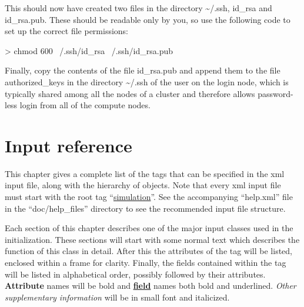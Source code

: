 \documentclass[11pt,english,fleqn]{report}
\newenvironment{code}{%
\footnotesize 
\verbatim
}{
\endverbatim
\normalsize
}
\begin{document}
This should now have created two files in the directory \textasciitilde{}/.ssh,
id\_rsa and id\_rsa.pub. These should be readable only by you, so
use the following code to set up the correct file permissions:

\begin{code}
> chmod 600 ~/.ssh/id_rsa ~/.ssh/id_rsa.pub
\end{code}

\noindent Finally, copy the contents of the file id\_rsa.pub and append them
to the file authorized\_keys in the directory \textasciitilde{}/.ssh
of the user on the login node, which is typically shared among all
the nodes of a cluster and therefore allows password-less login 
from all of the compute nodes.


\chapter{Input reference}

\label{hierarchy}

This chapter gives a complete list of the tags that can be
specified in the xml input file, along with the hierarchy of objects.
Note that every xml input file must start with the root tag 
{}``\hyperref[SIMULATION]{simulation}''. 
See the accompanying {}``help.xml'' file in the {}``doc/help\_files'' directory
to see the recommended input file structure.

Each section of this chapter describes one of the major input classes
used in the \ipi initialization. These sections will start with some normal
text which describes the function of this class in detail.
After this the attributes of the tag will be listed, enclosed within
a frame for clarity.
Finally, the fields contained within the tag will be listed in alphabetical order,
possibly followed by their attributes.
\textbf{Attribute} names will be bold and 
\textbf{\underline{field}} names both bold and underlined.
\emph{\small Other supplementary information} will be in small font and italicized.


%




























\end{document}
